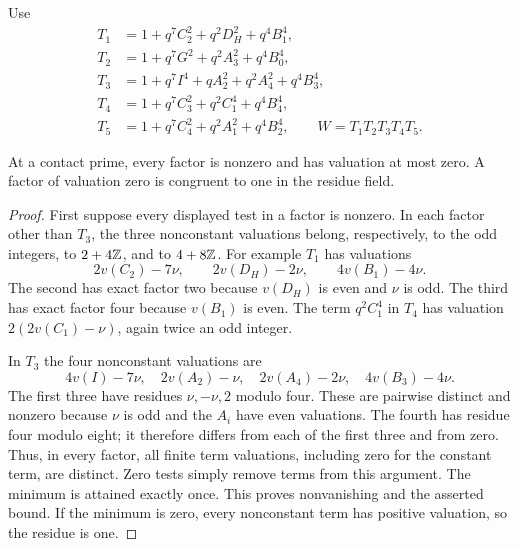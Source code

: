 \documentclass[11pt,a4paper]{article}
\begin{document}
Use
\begin{align*}
 T_1&=1+q^7C_2^2+q^2D_H^2+q^4B_1^4,\\
 T_2&=1+q^7G^2+q^2A_3^2+q^4B_0^4,\\
 T_3&=1+q^7I^4+qA_2^2+q^2A_4^2+q^4B_3^4,\\
 T_4&=1+q^7C_3^2+q^2C_1^4+q^4B_4^4,\\
 T_5&=1+q^7C_4^2+q^2A_1^2+q^4B_2^4,
 \qquad W=T_1T_2T_3T_4T_5.
\end{align*}

\begin{lemma}\label{lem:residues}
At a contact prime, every factor is nonzero and has valuation at most
zero. A factor of valuation zero is congruent to one in the residue field.
\end{lemma}
\begin{proof}
First suppose every displayed test in a factor is nonzero. In each
factor other than $T_3$, the three nonconstant valuations belong,
respectively, to the odd integers, to $2+4\mathbb Z$, and to $4+8\mathbb Z$.
For example $T_1$ has valuations
\[
 2v(C_2)-7\nu,\qquad 2v(D_H)-2\nu,\qquad4v(B_1)-4\nu.
\]
The second has exact factor two because $v(D_H)$ is even and $\nu$ is
odd. The third has exact factor four because $v(B_1)$ is even.
The term $q^2C_1^4$ in $T_4$ has valuation
$2(2v(C_1)-\nu)$, again twice an odd integer.

In $T_3$ the four nonconstant valuations are
\[
 4v(I)-7\nu,\quad 2v(A_2)-\nu,\quad
 2v(A_4)-2\nu,\quad4v(B_3)-4\nu.
\]
The first three have residues $\nu,-\nu,2$ modulo four. These are
pairwise distinct and nonzero because $\nu$ is odd and the $A_i$
have even valuations. The fourth has residue four modulo eight;
it therefore differs from each of the first three and from zero.
Thus, in every factor, all finite term valuations, including zero
for the constant term, are distinct. Zero tests simply remove terms
from this argument. The minimum is attained exactly once. This proves
nonvanishing and the asserted bound. If the minimum is zero, every
nonconstant term has positive valuation, so the residue is one.
\end{proof}
\end{document}

